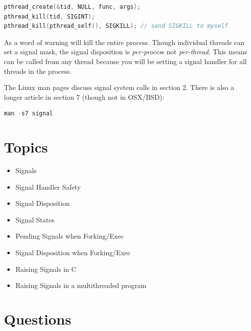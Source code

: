 \begin{lstlisting}[language=C]
pthread_create(&tid, NULL, func, args);
pthread_kill(tid, SIGINT);
pthread_kill(pthread_self(), SIGKILL); // send SIGKILL to myself
\end{lstlisting}

As a word of warning  will kill the entire process.
Though individual threads can set a signal mask, the signal disposition is \emph{per-proces}s not \emph{per-thread}.
This means  can be called from any thread because you will be setting a signal handler for all threads in the process.

The Linux man pages discuss signal system calls in section 2. There is also a longer article in section 7 (though not in OSX/BSD):

\begin{lstlisting}[language=C]
man -s7 signal
\end{lstlisting}

\section{Topics}

\begin{itemize}
\tightlist
\item
  Signals
\item
  Signal Handler Safety
\item
  Signal Disposition
\item
  Signal States
\item
  Pending Signals when Forking/Exec
\item
  Signal Disposition when Forking/Exec
\item
  Raising Signals in C
\item
  Raising Signals in a multithreaded program
\end{itemize}

\section{Questions}

